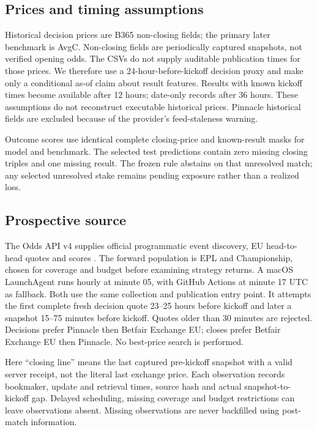 \documentclass[11pt]{article}
\begin{document}
\subsection{Prices and timing assumptions}
Historical decision prices are B365 non-closing fields; the primary later benchmark is
AvgC. Non-closing fields are periodically captured snapshots, not verified opening odds.
The CSVs do not supply auditable publication times for those prices. We therefore use a
24-hour-before-kickoff decision proxy and make only a conditional as-of claim about result
features. Results with known kickoff times become available after 12 hours; date-only
records after 36 hours. These assumptions do not reconstruct executable historical prices.
Pinnacle historical fields are excluded because of the provider's feed-staleness warning.

Outcome scores use identical complete closing-price and known-result masks for model
and benchmark. The selected test predictions contain zero missing closing triples and one missing result.
The frozen rule abstains on that unresolved match; any selected unresolved stake remains
pending exposure rather than a realized loss.

\subsection{Prospective source}
The Odds API v4 supplies official programmatic event discovery, EU head-to-head quotes and
scores \citep{oddsdocs}. The forward population is EPL and Championship, chosen for
coverage and budget before examining strategy returns. A macOS LaunchAgent runs hourly at minute 05, with GitHub Actions at minute 17 UTC as
fallback. Both use the same collection and publication entry point. It attempts the first complete fresh decision quote 23--25 hours
before kickoff and later a snapshot 15--75 minutes before kickoff. Quotes older than
30 minutes are rejected. Decisions prefer Pinnacle then Betfair Exchange EU; closes prefer
Betfair Exchange EU then Pinnacle. No best-price search is performed.

Here ``closing line'' means the last captured pre-kickoff snapshot with a valid server
receipt, not the literal last exchange price. Each observation records bookmaker, update
and retrieval times, source hash and actual snapshot-to-kickoff gap. Delayed scheduling,
missing coverage and budget restrictions can leave observations absent. Missing observations
are never backfilled using post-match information.
\end{document}

